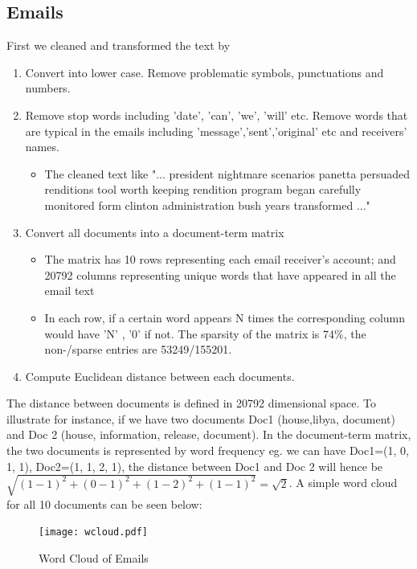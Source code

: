 \documentclass[11pt,a4paper]{article}
\begin{document}
\newpage
\subsection*{Emails} 
First we cleaned and transformed the text by 
\begin{enumerate}
\item Convert into lower case. Remove problematic symbols, punctuations and numbers.
\item Remove stop words including 'date', 'can', 'we', 'will' etc. Remove words that are typical in the emails including 'message','sent','original' etc and receivers' names.
\begin{itemize}
\item The cleaned text like "... president nightmare scenarios panetta persuaded renditions tool worth keeping rendition program began carefully monitored form clinton administration bush years transformed ..."
\end{itemize}
\item Convert all documents into a document-term matrix
\begin{itemize} 
\item The matrix has 10 rows representing each email receiver's account; and 20792 columns representing unique words that have appeared in all the email text
\item In each row, if a certain word appears N times the corresponding column would have 'N' , '0' if not. The sparsity of the matrix is 74\%, the non-/sparse entries are 53249/155201. 
\end{itemize}
\item Compute Euclidean distance between each documents.
\end{enumerate}
The distance between documents is defined in 20792 dimensional space. To illustrate for instance, if we have two documents Doc1 (house,libya, document) and Doc 2 (house, information, release, document). In the document-term matrix, the two documents is represented by word frequency eg. we can have Doc1=(1, 0, 1, 1), Doc2=(1, 1, 2, 1), the distance between Doc1 and Doc 2 will hence be $\sqrt{(1-1)^{2} + (0-1)^{2} + (1-2)^{2} + (1-1)^{2}} = \sqrt{2}$.
A simple word cloud for all 10 documents can be seen below:
\begin{figure}[h!]
    \centering
    \texttt{[image: wcloud.pdf]}
    \caption{Word Cloud of Emails}
\end{figure}

\newpage
\end{document}
